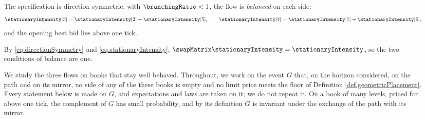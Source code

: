 \begin{assumption}\label{assumption.balancedFlow}
 The specification is direction-symmetric, with $\branchingRatio < 1$,
 the flow is \emph{balanced} on each side:
 \begin{equation*}
  \stationaryIntensity[3] = \stationaryIntensity[2] + \stationaryIntensity[5] ,
  \qquad
  \stationaryIntensity[4] = \stationaryIntensity[1] + \stationaryIntensity[6] ,
 \end{equation*}
 and the opening best bid lies above one tick.
\end{assumption}

By \eqref{eq.directionSymmetry} and \eqref{eq.stationaryIntensity},
$\swapMatrix\stationaryIntensity = \stationaryIntensity$,
so the two conditions of balance are one.

We study the three flows on books that stay well behaved.
Throughout, we work on the event $G$ that,
on the horizon considered,
on the path and on its mirror,
no side of any of the three books is empty
and no limit price meets the floor of Definition \ref{def.geometricPlacement}.
Every statement below is made on $G$,
and expectations and laws are taken on it;
we do not repeat it.
On a book of many levels, priced far above one tick,
the complement of $G$ has small probability,
and by its definition
$G$ is invariant under the exchange of the path with its mirror.

